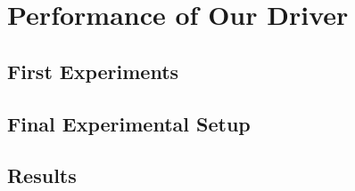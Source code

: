 \section{Performance of Our Driver}
\label{chap:performance}

\subsection{First Experiments}
\label{chap:performance.firstexperiments}

\subsection{Final Experimental Setup}
\label{chap:performance.finalsetup}

\subsection{Results}
\label{chap:performance.results}